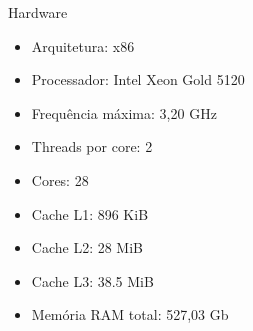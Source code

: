 \begin{frame}{Hardware}
    \begin{itemize}
        \item Arquitetura: x86
        \item Processador: Intel Xeon Gold 5120
        \item Frequência máxima: 3,20 GHz
        \item Threads por core: 2
        \item Cores: 28
        \item Cache L1: 896 KiB
        \item Cache L2: 28 MiB
        \item Cache L3: 38.5 MiB
        \item Memória RAM total: 527,03 Gb
    \end{itemize}
\end{frame}

